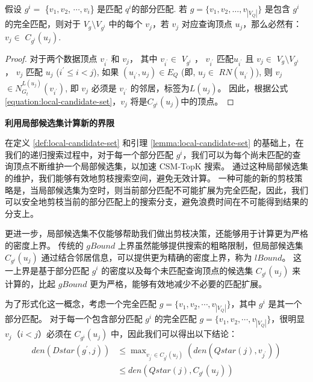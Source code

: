\begin{lemma} \label{lemma:local-candidate-set}
    假设 $g^i=$ \{$v_1, v_2$, $\cdots, v_i$\} 是匹配 $q^i$的部分匹配.
    若 $g=\{v_1, v_2, \dots, v_{|V_Q|}\}$ 是包含 $g^i$ 的完全匹配，则对于 $V_g\setminus V_{g^i}$ 中的每个 $v_j$，若 $v_j$ 对应查询顶点 $u_j$，那么必然有：
       $v_j\in$ $C_{g^i}(u_j)$.
    \end{lemma}

\begin{proof}
        对于两个数据顶点 $v_{i^\prime}$ 和 $v_j$， 其中 $v_{i^\prime}\in$ $V_{g^i}$ ，  $v_{i^\prime}$ 匹配$u_{i^\prime}$ 
            且 $v_{j}\in$ $V_{g}\setminus V_{g^i}$ ， $v_{j}$ 匹配 $u_j$ ($i^\prime\leq i<j$), 
            如果 $(u_{i^\prime}, u_j)\in E_Q$ (即, $u_j\in$ $RN(u_{i^\prime})$), 则 $v_j$ $\in N_{G_t}^{L(u_j)}(v_{i^\prime})$, 即 $v_j$ 必须是 $v_{i^\prime}$ 的邻居，标签为$L(u_j)$。
            因此，根据公式\ref{equation:local-candidate-set}，$v_j$ 将是$C_{g^i}(u_j)$中的顶点。
\end{proof}

\textbf{利用局部候选集计算新的界限}

在定义 \ref{def:local-candidate-set} 和引理 \ref{lemma:local-candidate-set} 的基础上，在我们的递归搜索过程中，对于每一个部分匹配 $g^i$，我们可以为每个尚未匹配的查询顶点不断维护一个局部候选集，以加速 CSM-TopK 搜索。
通过这种局部候选集的维护，我们能够有效地剪枝搜索空间，避免无效计算。
一种可能的新的剪枝策略是，当局部候选集为空时，则当前部分匹配不可能扩展为完全匹配，因此，我们可以安全地剪枝当前的部分匹配上的搜索分支，避免浪费时间在不可能得到结果的分支上。

更进一步，局部候选集不仅能够帮助我们做出剪枝决策，还能够用于计算更为严格的密度上界。
传统的 $gBound$ 上界虽然能够提供搜索的粗略限制，但局部候选集 $C_{g^i}(u_j)$ 通过结合邻居信息，可以提供更为精确的密度上界，称为 $lBound$。
这一上界是基于部分匹配 $g^i$ 的密度以及每个未匹配查询顶点的候选集 $C_{g^i}(u_j)$ 来计算的，比起 $gBound$ 更为严格，能够有效地减少不必要的匹配扩展。

为了形式化这一概念，考虑一个完全匹配 $g=\{v_1, v_2, \cdots, v_{|V_Q|}\}$，其中 $g^i$ 是其一个部分匹配。
对于每一个包含部分匹配 $g^i$ 的完全匹配 $g=\{v_1, v_2, \cdots, v_{|V_Q|}\}$，很明显 $v_j$（$i < j$）必须在 $C_{g^i}(u_j)$ 中，因此我们可以得出以下结论：
\begin{equation*}
    \begin{aligned}
      den(Dstar(g^\prime, j)) & \leq \max\nolimits_{v_{j^\prime}\in C_{g^i}(u_j)}\left(den(Qstar(j), v_{j^\prime})\right) \\
        & \leq den(Qstar(j), C_{g^i}(u_j))
    \end{aligned}
\end{equation*}


